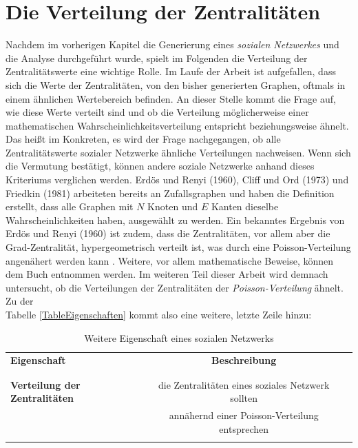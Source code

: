 \section{Die Verteilung der Zentralitäten}
Nachdem im vorherigen Kapitel die Generierung eines \textit{sozialen Netzwerkes} und die Analyse durchgeführt wurde, spielt im Folgenden die Verteilung der Zentralitätswerte eine wichtige Rolle.
Im Laufe der Arbeit ist aufgefallen, dass sich die Werte der Zentralitäten, von den bisher generierten Graphen, oftmals in einem ähnlichen Wertebereich befinden. An dieser Stelle kommt die Frage auf, wie diese Werte verteilt sind und ob die Verteilung möglicherweise einer mathematischen Wahrscheinlichkeitsverteilung entspricht beziehungsweise ähnelt. Das heißt im Konkreten, es wird der Frage nachgegangen, ob alle Zentralitätswerte sozialer Netzwerke ähnliche Verteilungen nachweisen. Wenn sich die Vermutung bestätigt, können andere soziale Netzwerke anhand dieses Kriteriums verglichen werden.
Erdös und Renyi (1960), Cliff und Ord (1973) und Friedkin (1981) arbeiteten bereits an Zufallsgraphen und haben die Definition erstellt, dass alle Graphen mit $N$ Knoten und $E$ Kanten dieselbe Wahrscheinlichkeiten haben, ausgewählt zu werden. Ein bekanntes Ergebnis von Erdös und Renyi (1960) ist zudem, dass die Zentralitäten, vor allem aber die Grad-Zentralität, hypergeometrisch verteilt ist, was durch eine Poisson-Verteilung angenähert werden kann \cite{Distribution}. Weitere, vor allem mathematische Beweise, können dem Buch \cite{Distribution} entnommen werden. Im weiteren Teil dieser Arbeit wird demnach untersucht, ob die Verteilungen der Zentralitäten der \textit{Poisson-Verteilung} ähnelt. Zu der \\ Tabelle \ref{TableEigenschaften} kommt also eine weitere, letzte Zeile hinzu:

\begin{table}[h!]
\footnotesize
\caption{Weitere Eigenschaft eines sozialen Netzwerks}
\label{TableEigenschaften2.0}
\centering
\begin{tabular}{lcc}\toprule 
\textbf{Eigenschaft} &\textbf{Beschreibung} \\
 &\\\midrule
 \\
  \textbf{Verteilung der Zentralitäten} & die Zentralitäten eines soziales Netzwerk sollten \\ &annähernd einer Poisson-Verteilung entsprechen \cite{verteilung} \\
  \\\bottomrule
 \end{tabular}
 \end{table}

